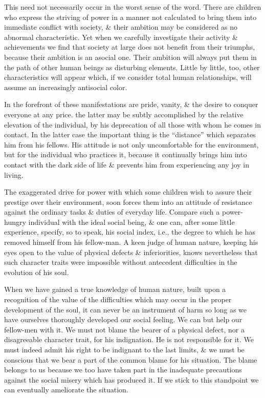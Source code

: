 \documentclass{article}
\begin{document}
This need not necessarily occur in the worst sense of the word. There are children who express the striving of power in a manner not calculated to bring them into immediate conflict with society, \& their ambition may be considered as no abnormal characteristic. Yet when we carefully investigate their activity \& achievements we find that society at large does not benefit from their triumphs, because their ambition is an asocial one. Their ambition will always put them in the path of other human beings as disturbing elements. Little by little, too, other characteristics will appear which, if we consider total human relationships, will assume an increasingly antisocial color.

In the forefront of these manifestations are pride, vanity, \& the desire to conquer everyone at any price. the latter may be subtly accomplished by the relative elevation of the individual, by his deprecation of all those with whom he comes in contact. In the latter case the important thing is the ``distance'' which separates him from his fellows. His attitude is not only uncomfortable for the environment, but for the individual who practices it, because it continually brings him into contact with the dark side of life \& prevents him from experiencing any joy in living.

The exaggerated drive for power with which some children wish to assure their prestige over their environment, soon forces them into an attitude of resistance against the ordinary tasks \& duties of everyday life. Compare such a power-hungry individual with the ideal social being, \& one can, after some little experience, specify, so to speak, his social index, i.e., the degree to which he has removed himself from his fellow-man. A keen judge of human nature, keeping his eyes open to the value of physical defects \& inferiorities, knows nevertheless that such character traits were impossible without antecedent difficulties in the evolution of his soul.

When we have gained a true knowledge of human nature, built upon a recognition of the value of the difficulties which may occur in the proper development of the soul, it can never be an instrument of harm so long as we have ourselves thoroughly developed our social feeling. We can but help our fellow-men with it. We must not blame the bearer of a physical defect, nor a disagreeable character trait, for his indignation. He is not responsible for it. We must indeed admit his right to be indignant to the last limits, \& we must be conscious that we bear a part of the common blame for his situation. The blame belongs to us because we too have taken part in the inadequate precautions against the social misery which has produced it. If we stick to this standpoint we can eventually ameliorate the situation.
\end{document}
